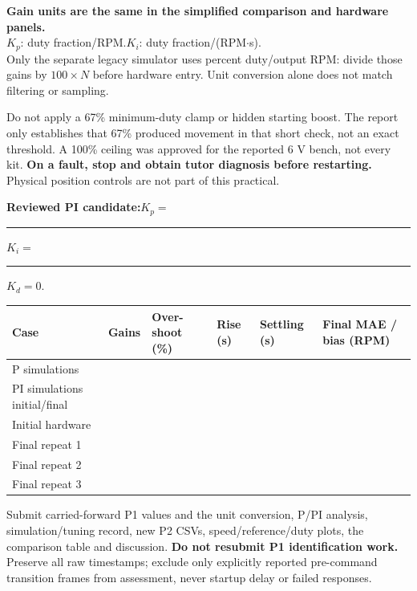 \documentclass[11pt,a4paper]{article}
\newcommand{\sect}[1]{\vspace{4pt}{\large\bfseries\color{teal}#1}\par\vspace{3pt}}
\newcommand{\note}[1]{\par\begingroup\setlength{\fboxsep}{7pt}\noindent\colorbox{pale}{\parbox{\dimexpr\linewidth-14pt\relax}{#1}}\endgroup\par}
\newcommand{\warn}[1]{\par\begingroup\setlength{\fboxsep}{7pt}\noindent\colorbox{warning}{\parbox{\dimexpr\linewidth-14pt\relax}{#1}}\endgroup\par}
\newcommand{\blank}{\rule{27mm}{0.3pt}}
\begin{document}
\note{\textbf{Gain units are the same in the simplified comparison and hardware panels.}\\
$K_p$: duty fraction/RPM.\quad $K_i$: duty fraction/(RPM$\cdot$s).\\
Only the separate legacy simulator uses percent duty/output RPM: divide those gains by $100\times N$ before hardware entry. Unit conversion alone does not match filtering or sampling.}
\warn{Do not apply a 67\% minimum-duty clamp or hidden starting boost. The report only establishes that 67\% produced movement in that short check, not an exact threshold. A 100\% ceiling was approved for the reported 6 V bench, not every kit. \textbf{On a fault, stop and obtain tutor diagnosis before restarting.} Physical position controls are not part of this practical.}
\textbf{Reviewed PI candidate:}\quad $K_p=$ \blank\quad $K_i=$ \blank\quad $K_d=0$.

\newpage
\sect{6. Results and submission}
\par\noindent\begin{tabularx}{\linewidth}{@{}p{33mm}p{25mm}YYYY@{}}
\toprule
\textbf{Case}&\textbf{Gains}&\textbf{Over-shoot (\%)}&\textbf{Rise (s)}&\textbf{Settling (s)}&\textbf{Final MAE / bias (RPM)}\\\midrule
P simulations&&&&&\\[14pt]\midrule
PI simulations initial/final&&&&&\\[10pt]\midrule
Initial hardware&&&&&\\[14pt]\midrule
Final repeat 1&&&&&\\[14pt]\midrule
Final repeat 2&&&&&\\[14pt]\midrule
Final repeat 3&&&&&\\[14pt]\bottomrule
\end{tabularx}\par
Submit carried-forward P1 values and the unit conversion, P/PI analysis, simulation/tuning record, new P2 CSVs, speed/reference/duty plots, the comparison table and discussion. \textbf{Do not resubmit P1 identification work.} Preserve all raw timestamps; exclude only explicitly reported pre-command transition frames from assessment, never startup delay or failed responses.
\end{document}
